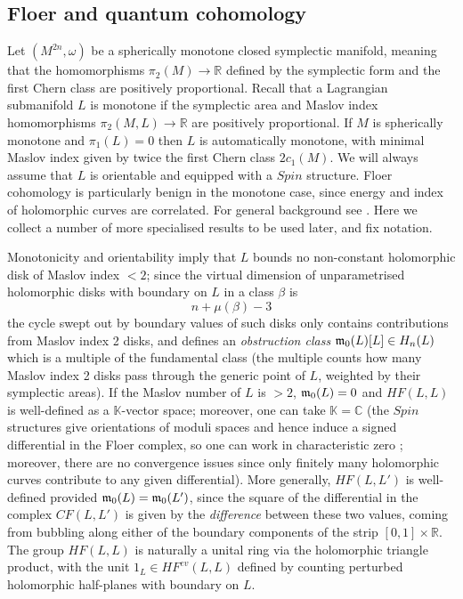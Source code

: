 \documentclass[reqno,10pt]{amsart}
\numberwithin{equation}{section}
\newcommand{\bC}{{\mathbb C}}
\newcommand{\bK}{{\mathbb K}}
\newcommand{\bR}{{\mathbb R}}
\theoremstyle{remark}
\begin{document}
\subsection{Floer and quantum cohomology\label{SubSec:Floer}}
Let $(M^{2n},\omega)$ be a spherically monotone closed symplectic manifold, meaning that the homomorphisms $\pi_2(M) \rightarrow \bR$ defined by the symplectic form and the first Chern class are positively proportional. Recall that a Lagrangian submanifold $L$ is monotone if  the symplectic area and Maslov index homomorphisms $\pi_2(M,L)\rightarrow \bR$ are positively proportional.  If $M$ is spherically monotone and $\pi_1(L)=0$ then $L$ is automatically monotone, with minimal Maslov index given by twice the first Chern class $2c_1(M)$. We will always assume that $L$ is orientable and equipped with a $Spin$ structure.  Floer cohomology is particularly benign in the monotone case, since energy and index of holomorphic curves are correlated.  For general background see \cite{Floer:lagrangian, Oh, BiranCornea}.  Here we collect a number of more specialised results to be used later, and fix notation.

 Monotonicity and orientability imply that $L$ bounds no non-constant holomorphic disk of Maslov index $<2$; since the virtual dimension of unparametrised holomorphic disks with boundary on $L$ in a class $\beta$ is 
\[
n+\mu(\beta)-3
\]
the cycle swept out by boundary values of such disks only contains contributions from Maslov index 2 disks, and defines an \emph{obstruction class} $\frak{m}_0(L)[L] \in H_n(L)$ which is a multiple of the fundamental class (the multiple counts how many Maslov index 2 disks pass through the generic point of $L$, weighted by their symplectic areas). 
If the Maslov number of $L$ is $>2$, $\frak{m}_0(L)=0$ and $HF(L,L)$ is well-defined as a $\bK$-vector space; moreover, one can take $\bK = \bC$ (the $Spin$ structures give orientations of moduli spaces and hence induce a signed differential in the Floer complex, so one can work in characteristic zero \cite[Chapter 9]{FO3}; moreover, there are no convergence issues since only finitely many holomorphic curves contribute to any given differential).  More generally, $HF(L,L')$ is well-defined provided $\frak{m}_0(L)=\frak{m}_0(L')$, since the square of the differential in the complex $CF(L,L')$ is given by the \emph{difference} between these two values, coming from bubbling along either of the boundary components of the strip $[0,1]\times\bR$.  
The group $HF(L,L)$ is naturally a unital ring via the holomorphic triangle product, with the unit $1_L \in HF^{ev}(L,L)$ defined by counting perturbed holomorphic half-planes with boundary on $L$.
\end{document}
